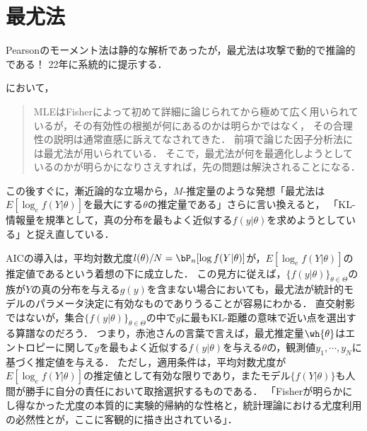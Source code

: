 \documentclass[uplatex,dvipdfmx]{jsreport}
\begin{document}
\section{最尤法}

\begin{tcolorbox}[colframe=ForestGreen, colback=ForestGreen!10!white,breakable,colbacktitle=ForestGreen!40!white,coltitle=black,fonttitle=\bfseries\sffamily,
title=]
    Pearsonのモーメント法は静的な解析であったが，最尤法は攻撃で動的で推論的である！
    22年\cite{Fisher22}に系統的に提示する．
\end{tcolorbox}

\begin{history}[赤池さんはFisherの超克を意識していた]
    \cite{赤池-AIC-数理科学}において，
    \begin{quote}
        MLEはFisherによって初めて詳細に論じられてから極めて広く用いられているが，その有効性の根拠が何にあるのかは明らかではなく，
        その合理性の説明は通常直感に訴えてなされてきた．
        前項で論じた因子分析法には最尤法が用いられている．
        そこで，最尤法が何を最適化しようとしているのかが明らかになりさえすれば，先の問題は解決されることになる．
    \end{quote}
    この後すぐに，漸近論的な立場から，$M$-推定量のような発想「最尤法は$E[\log_ef(Y|\theta)]$を最大にする$\theta$の推定量である」さらに言い換えると，
    「KL-情報量を規準として，真の分布を最もよく近似する$f(y|\theta)$を求めようとしている」と捉え直している．

    AICの導入は，平均対数尤度$l(\theta)/N=\bP_n[\log f(Y|\theta)]$が，$E[\log_ef(Y|\theta)]$の推定値であるという着想の下に成立した．
    この見方に従えば，$\{f(y|\theta)\}_{\theta\in\Theta}$の族が$Y$の真の分布を与える$g(y)$を含まない場合においても，最尤法が統計的モデルのパラメータ決定に有効なものでありうることが容易にわかる．
    直交射影ではないが，集合$\{f(y|\theta)\}_{\theta\in\Theta}$の中で$g$に最もKL-距離の意味で近い点を選出する算譜なのだろう．
    つまり，赤池さんの言葉で言えば，最尤推定量$\wh{\theta}$はエントロピーに関して$g$を最もよく近似する$f(y|\theta)$を与える$\theta$の，観測値$y_1,\cdots,y_N$に基づく推定値を与える．
    ただし，適用条件は，平均対数尤度が$E[\log_ef(Y|\theta)]$の推定値として有効な限りであり，またモデル$\{f(Y|\theta)\}$も人間が勝手に自分の責任において取捨選択するものである．
    「Fisherが明らかにし得なかった尤度の本質的に実験的帰納的な性格と，統計理論における尤度利用の必然性とが，ここに客観的に描き出されている」．
\end{history}
\end{document}
